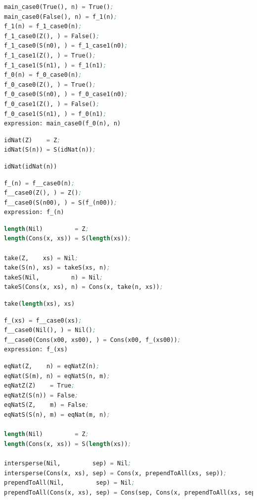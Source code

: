 \documentclass[submission,copyright,creativecommons]{eptcs}
\begin{document}
\begin{lstlisting}[language=Lisp,keywords={},caption=Even-or-odd First/Minimal Result]
main_case0(True(), n) = True();
main_case0(False(), n) = f_1(n);
f_1(n) = f_1_case0(n);
f_1_case0(Z(), ) = False();
f_1_case0(S(n0), ) = f_1_case1(n0);
f_1_case1(Z(), ) = True();
f_1_case1(S(n1), ) = f_1(n1);
f_0(n) = f_0_case0(n);
f_0_case0(Z(), ) = True();
f_0_case0(S(n0), ) = f_0_case1(n0);
f_0_case1(Z(), ) = False();
f_0_case1(S(n1), ) = f_0(n1);
expression: main_case0(f_0(n), n)
\end{lstlisting}

\begin{lstlisting}[language=Lisp,keywords={},caption=idNat Idempotent Program]
idNat(Z)    = Z;
idNat(S(n)) = S(idNat(n));
\end{lstlisting}

\begin{lstlisting}[language=Lisp,keywords={},caption=idNat Idempotent Expression]
idNat(idNat(n))
\end{lstlisting}

\begin{lstlisting}[language=Lisp,keywords={},caption=idNat Idempotent Last/Minimal Result]
f_(n) = f__case0(n);
f__case0(Z(), ) = Z();
f__case0(S(n00), ) = S(f_(n00));
expression: f_(n)
\end{lstlisting}

\begin{lstlisting}[language=Lisp,keywords={},caption=take-length Program]
length(Nil)         = Z;
length(Cons(x, xs)) = S(length(xs));

take(Z,    xs) = Nil;
take(S(n), xs) = takeS(xs, n);
takeS(Nil,         n) = Nil;
takeS(Cons(x, xs), n) = Cons(x, take(n, xs));
\end{lstlisting}

\begin{lstlisting}[language=Lisp,keywords={},caption=take-length Expression]
take(length(xs), xs)
\end{lstlisting}

\begin{lstlisting}[language=Lisp,keywords={},caption=take-length Last/Minimal Result]
f_(xs) = f__case0(xs);
f__case0(Nil(), ) = Nil();
f__case0(Cons(x00, xs00), ) = Cons(x00, f_(xs00));
expression: f_(xs)
\end{lstlisting}

\begin{lstlisting}[language=Lisp,keywords={},caption=length-intersperse Program]
eqNat(Z,    n) = eqNatZ(n);
eqNat(S(m), n) = eqNatS(n, m);
eqNatZ(Z)    = True;
eqNatZ(S(n)) = False;
eqNatS(Z,    m) = False;
eqNatS(S(n), m) = eqNat(m, n);

length(Nil)         = Z;
length(Cons(x, xs)) = S(length(xs));

intersperse(Nil,         sep) = Nil;
intersperse(Cons(x, xs), sep) = Cons(x, prependToAll(xs, sep));
prependToAll(Nil,         sep) = Nil;
prependToAll(Cons(x, xs), sep) = Cons(sep, Cons(x, prependToAll(xs, sep)));
\end{lstlisting}
\end{document}
